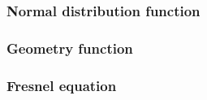 \documentclass[
  11pt,
  a4paper,
  oneside
  ]{article}
\begin{document}
\subsubsection{Normal distribution function}
\subsubsection{Geometry function}
\subsubsection{Fresnel equation}






\end{document}
